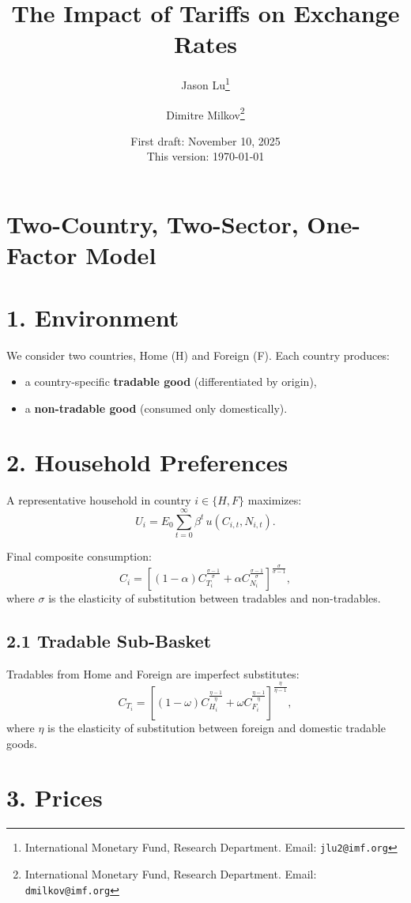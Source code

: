 \documentclass[11pt]{article}
\title{The Impact of Tariffs on Exchange Rates}
\author{
Jason Lu\thanks{International Monetary Fund, Research Department. Email: {\tt jlu2@imf.org}} 
\and 
Dimitre Milkov\thanks{International Monetary Fund, Research Department. Email: {\tt dmilkov@imf.org}}
}
\date{First draft: November 10, 2025 \\ This version: \today}
\begin{document}
\maketitle

\section*{Two-Country, Two-Sector, One-Factor Model}

\section*{1. Environment}

We consider two countries, Home (H) and Foreign (F). 
Each country produces:
\begin{itemize}
    \item a country-specific \textbf{tradable good} (differentiated by origin),
    \item a \textbf{non-tradable good} (consumed only domestically).
\end{itemize}

\section*{2. Household Preferences}

A representative household in country $i \in \{H,F\}$ maximizes:
\[
U_i = E_0 \sum_{t=0}^{\infty} \beta^t \, u(C_{i,t}, N_{i,t}).
\]



Final composite consumption: 
\[
C_{i}=\left[ (1-\alpha )C_{T_{i}}^{\frac{\sigma -1}{\sigma }}+\alpha
C_{N_{i}}^{\frac{\sigma -1}{\sigma }}\right] ^{\frac{\sigma }{\sigma -1}}, 
\]%
where $\sigma $ is the elasticity of substitution between tradables and
non-tradables.

\subsection*{2.1 Tradable Sub-Basket}

Tradables from Home and Foreign are imperfect substitutes: 
\[
C_{T_{i}}=\left[ (1-\omega )C_{H_{i}}^{\frac{\eta -1}{\eta }}+\omega
C_{F_{i}}^{\frac{\eta -1}{\eta }}\right] ^{\frac{\eta }{\eta -1}}, 
\]%
where $\eta $ is the elasticity of substitution between foreign and domestic
tradable goods.

\section*{3. Prices}
\end{document}
